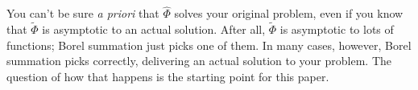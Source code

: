 \documentclass{article}
\newcommand{\done}[1]{\textcolor{gray}{#1}}
\newcommand{\series}[1]{\tilde{#1}}
\newcommand{\laplace}{\mathcal{L}}
\theoremstyle{definition}
\theoremstyle{plain}
\begin{document}
You can't be sure {\em a priori} that $\hat{\Phi}$ solves your original problem, even if you know that $\series{\Phi}$ is asymptotic to an actual solution. After all, $\series{\Phi}$ is asymptotic to lots of functions; Borel summation just picks one of them. In many cases, however, Borel summation picks correctly, delivering an actual solution to your problem. The question of how that happens is the starting point for this paper.

\end{document}
